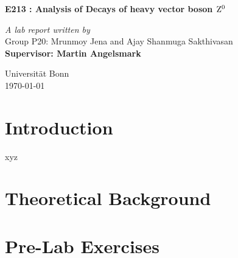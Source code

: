 \documentclass[a4paper]{report}
\begin{document}
\begin{onehalfspace}
\vspace*{0.5in}
\begin{center}
\begin{LARGE}
\textbf{E213 : Analysis of Decays of heavy vector boson $\rm Z^{0}$}\\ 
\end{LARGE}
\bigskip
\bigskip
\textit{A lab report written by}\\
Group P20: Mrunmoy Jena and Ajay Shanmuga Sakthivasan\\
\medskip
\textbf{Supervisor: Martin Angelsmark}\\
\vspace*{5in}
\begin{flushright}
Universit\"{a}t	Bonn\\
\today
\end{flushright}
\end{center}
\tableofcontents
\chapter*{Introduction}
xyz
\chapter*{Theoretical Background}
%
\chapter*{Pre-Lab Exercises}

%
%
%

\end{onehalfspace}
\printbibliography
\end{document}

